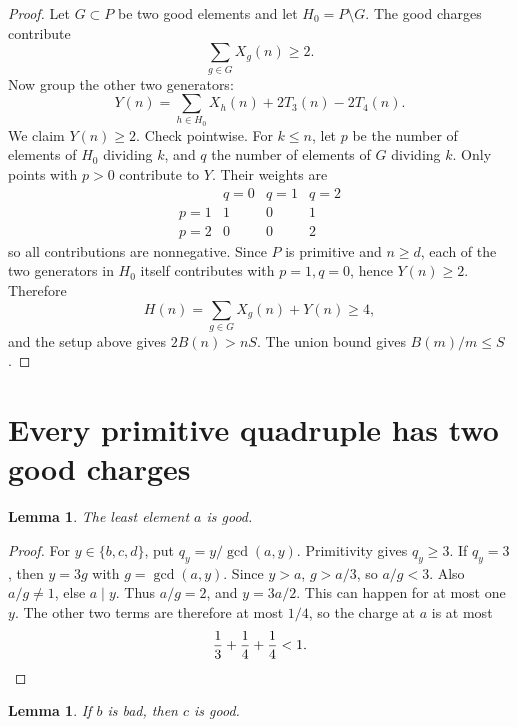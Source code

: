 \documentclass[11pt]{article}
\newtheorem{lemma}[theorem]{Lemma}
\theoremstyle{remark}
\begin{document}
\begin{proof}
Let \(G\subset P\) be two good elements and let \(H_0=P\setminus G\).  The good
charges contribute
\[
  \sum_{g\in G}X_g(n)\ge2.
\]
Now group the other two generators:
\[
  Y(n)=\sum_{h\in H_0}X_h(n)+2T_3(n)-2T_4(n).
\]
We claim \(Y(n)\ge2\).  Check pointwise.  For \(k\le n\), let \(p\) be the number
of elements of \(H_0\) dividing \(k\), and \(q\) the number of elements of \(G\)
dividing \(k\).  Only points with \(p>0\) contribute to \(Y\).  Their weights are
\[
\begin{array}{c|ccc}
 & q=0&q=1&q=2\\ \hline
p=1&1&0&1\\
p=2&0&0&2
\end{array}
\]
so all contributions are nonnegative.  Since \(P\) is primitive and \(n\ge d\),
each of the two generators in \(H_0\) itself contributes with \(p=1,q=0\), hence
\(Y(n)\ge2\).  Therefore
\[
H(n)=\sum_{g\in G}X_g(n)+Y(n)\ge4,
\]
and the setup above gives \(2B(n)>nS\).  The union bound gives
\(B(m)/m\le S\).
\end{proof}

\section{Every primitive quadruple has two good charges}

\begin{lemma}
The least element \(a\) is good.
\end{lemma}

\begin{proof}
For \(y\in\{b,c,d\}\), put \(q_y=y/\gcd(a,y)\).  Primitivity gives \(q_y\ge3\).
If \(q_y=3\), then \(y=3g\) with \(g=\gcd(a,y)\).  Since \(y>a\), \(g>a/3\), so
\(a/g<3\).  Also \(a/g\ne1\), else \(a\mid y\).  Thus \(a/g=2\), and
\(y=3a/2\).  This can happen for at most one \(y\).  The other two terms are
therefore at most \(1/4\), so the charge at \(a\) is at most
\[
  {1\over3}+{1\over4}+{1\over4}<1.
\]
\end{proof}

\begin{lemma}
If \(b\) is bad, then \(c\) is good.
\end{lemma}
\end{document}
